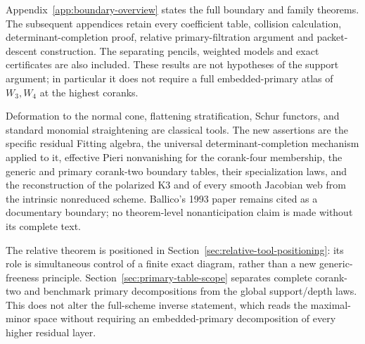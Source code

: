 Appendix~\ref{app:boundary-overview} states the full boundary and
family theorems.  The subsequent appendices retain every coefficient
table, collision calculation, determinant-completion proof, relative
primary-filtration argument and packet-descent construction.  The
separating pencils, weighted models and exact certificates are also
included.  These results are not hypotheses of the support argument;
in particular it does not require a full embedded-primary atlas of
\(W_3,W_4\) at the highest coranks.

Deformation to the normal cone, flattening stratification, Schur
functors, and standard monomial straightening are classical tools.
The new assertions are the specific residual Fitting algebra, the
universal determinant-completion mechanism applied to it, effective
Pieri nonvanishing for the corank-four membership, the generic and
primary corank-two boundary tables, their specialization laws, and
the reconstruction of the polarized K3 and of every smooth Jacobian
web from the intrinsic nonreduced scheme.  Ballico's 1993 paper remains cited as a documentary boundary;
no theorem-level nonanticipation claim is made without its complete
text.

The relative theorem is positioned in
Section~\ref{sec:relative-tool-positioning}: its role is simultaneous
control of a finite exact diagram, rather than a new generic-freeness
principle.  Section~\ref{sec:primary-table-scope} separates complete
corank-two and benchmark primary decompositions from the global
support/depth laws.  This does not alter the full-scheme inverse
statement, which reads the maximal-minor space without requiring an
embedded-primary decomposition of every higher residual layer.
